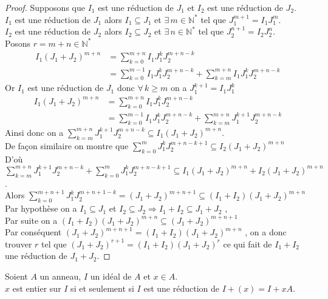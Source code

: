 \begin{proof}
	Supposons que $I_1$ est une réduction de $J_1$ et $I_2$ est une réduction de $J_2$.\\
	$I_1$ est une réduction de $J_1$ alors $I_1 \subseteq J_1$ et $\exists \, m \in \mathbb{N^*}$ tel que $J_1^{m+1} = I_1 J_1^m$.\\
	$I_2$ est une réduction de $J_2$ alors $I_2 \subseteq J_2$ et $\exists \, n \in \mathbb{N^*}$ tel que $J_2^{n+1} = I_2 J_2^n$.\\
	Posons $r=m+n \in \mathbb{N^*} $\\
	\begin{align*}
		I_1(J_1+J_2)^{m+n}& = \displaystyle \sum_{k=0}^{m+n}{I_1 J_1^k J_2^{m+n-k}}\\
		& = \displaystyle \sum_{k=0}^{m-1}{I_1 J_1^k J_2^{m+n-k}} + \displaystyle \sum_{k=m}^{m+n}{I_1 J_1^k J_2^{m+n-k}}
	\end{align*}
	Or $I_1$ est une réduction de $J_1$ donc $\forall \, k\geq m$ on a $J_1^{k+1} = I_1 J_1^{k}$
	\begin{align*}
		I_1(J_1+J_2)^{m+n}& = \displaystyle \sum_{k=0}^{m+n}{I_1 J_1^k J_2^{m+n-k}}\\
		& = \displaystyle \sum_{k=0}^{m-1}{I_1 J_1^k J_2^{m+n-k}} + \displaystyle \sum_{k=m}^{m+n}{J_1^{k+1} J_2^{m+n-k}}
	\end{align*}
	Ainsi donc on a $\displaystyle \sum_{k=m}^{m+n}{J_1^{k+1} J_2^{m+n-k}} \subseteq  I_1(J_1+J_2)^{m+n}$.\\
	De façon similaire on montre que $\displaystyle \sum_{k=0}^{m}{J_1^{k} J_2^{m+n-k+1}} \subseteq  I_2(J_1+J_2)^{m+n}$\\
	D'où $\displaystyle \sum_{k=m}^{m+n}{J_1^{k+1} J_2^{m+n-k}} + \displaystyle \sum_{k=0}^{m}{J_1^{k} J_2^{m+n-k+1}} \subseteq I_1(J_1+J_2)^{m+n} + I_2(J_1+J_2)^{m+n}$.\\ Alors $\displaystyle \sum_{k=0}^{m+n+1}{J_1^{k} J_2^{m+n+1-k}} = (J_1+J_2)^{m+n+1} \subseteq (I_1+I_2)(J_1+J_2)^{m+n}$\\
	Par hypothèse on a $I_1 \subseteq J_1$ et $I_2 \subseteq J_2 \Rightarrow I_1+I_2 \subseteq J_1+J_2$ ,\\
	Par suite on a $(I_1+I_2)(J_1+J_2)^{m+n} \subseteq (J_1+J_2)^{m+n+1}$\\ Par conséquent $(J_1+J_2)^{m+n+1} = (I_1+I_2)(J_1+J_2)^{m+n}$ , on a donc trouver $r$ tel que $(J_1+J_2)^{r+1} = (I_1+I_2)(J_1+J_2)^{r}$ ce qui fait de $I_1+I_2$  une réduction de $J_1+J_2$.
\end{proof}
\begin{maproposition}
	Soient $A$ un anneau, $I$ un idéal de $A$ et $x \in A$.\\
	$x$ est entier sur $I$ si et seulement si $I$ est une réduction de $I + (x) = I +xA $.
\end{maproposition}
